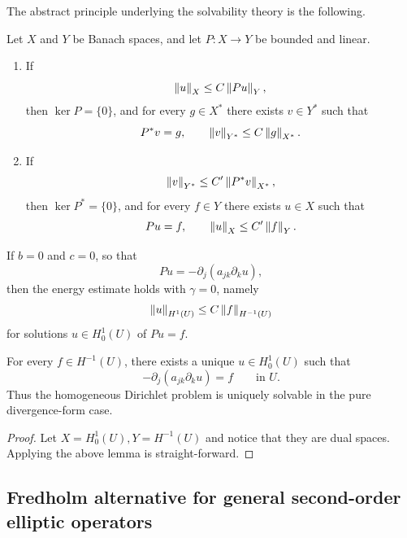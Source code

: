 The abstract principle underlying the solvability theory is the following.

\begin{lemma}
Let $X$ and $Y$ be Banach spaces, and let $P:X\to Y$ be bounded and linear.
\begin{enumerate}
    \item If
    \[
    \left\lVert u \right\rVert_X \leq C\left\lVert Pu \right\rVert_Y,
    \]
    then $\ker P=\{0\}$, and for every $g\in X^*$ there exists $v\in Y^*$ such that
    \[
    P^*v=g,
    \qquad
    \left\lVert v \right\rVert_{Y^*}\leq C\left\lVert g \right\rVert_{X^*}.
    \]
    \item If
    \[
    \left\lVert v \right\rVert_{Y^*} \leq C'\left\lVert P^*v \right\rVert_{X^*},
    \]
    then $\ker P^*=\{0\}$, and for every $f\in Y$ there exists $u\in X$ such that
    \[
    Pu=f,
    \qquad
    \left\lVert u \right\rVert_X\leq C'\left\lVert f \right\rVert_Y.
    \]
\end{enumerate}
\end{lemma}

\begin{lemma}
If $b=0$ and $c=0$, so that
\[
Pu=-\partial_j(a_{jk}\partial_k u),
\]
then the energy estimate holds with $\gamma=0$, namely
\[
\left\lVert u \right\rVert_{H^1(U)}\leq C\left\lVert f \right\rVert_{H^{-1}(U)}
\]
for solutions $u\in H_0^1(U)$ of $Pu=f$.
\end{lemma}

\begin{theorem}
For every $f\in H^{-1}(U)$, there exists a unique $u\in H_0^1(U)$ such that
\[
-\partial_j(a_{jk}\partial_k u)=f
\qquad \text{in }U.
\]
Thus the homogeneous Dirichlet problem is uniquely solvable in the pure divergence-form case.
\end{theorem}
\begin{proof}
    Let $X = H^1_0(U), Y = H^{-1}(U)$ and notice that they are dual spaces. Applying the above lemma is straight-forward.
\end{proof}

\subsection{Fredholm alternative for general second-order elliptic operators}


